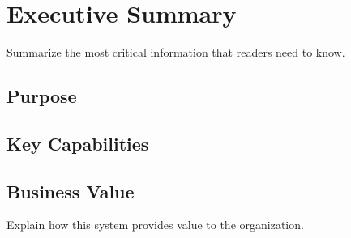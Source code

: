 \section{Executive Summary}


\begin{keyinsight}
Summarize the most critical information that readers need to know.
\end{keyinsight}

\subsection{Purpose}


\subsection{Key Capabilities}


\subsection{Business Value}

\begin{businessvalue}
Explain how this system provides value to the organization.
\end{businessvalue}
